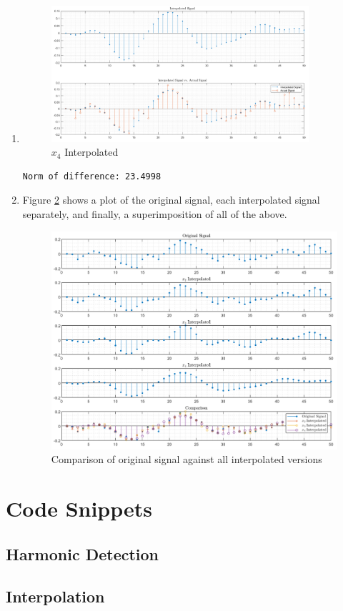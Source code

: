 \documentclass{article}[a4paper]
\begin{document}
\begin{enumerate}[label=(\alph*)]
		\item \phantom{a}
		\begin{figure}[H]
			\centering
			\includegraphics[width=0.9\textwidth]{images/q2_x4_interp.png}
			\caption{$x_4$ Interpolated}
			\label{x4_interp}
		\end{figure}
		
		\begin{lstlisting}[caption={Code output}, label=x4_x_norm]
Norm of difference: 23.4998
		\end{lstlisting}
		
		\item Figure \ref{all_compare} shows a plot of the original signal, each interpolated signal separately, and finally, a superimposition of all of the above.
		
		\begin{figure}[H]
			\centering
			\includegraphics[width=\linewidth]{images/q2_all_compare.png}
			\caption{Comparison of original signal against all interpolated versions}
			\label{all_compare}
		\end{figure}
		
		
	\end{enumerate}
	
	\appendix
	\section{Code Snippets}
	\label{code}
	
	\subsection{Harmonic Detection}
	
	\subsection{Interpolation}
	
\end{document}
